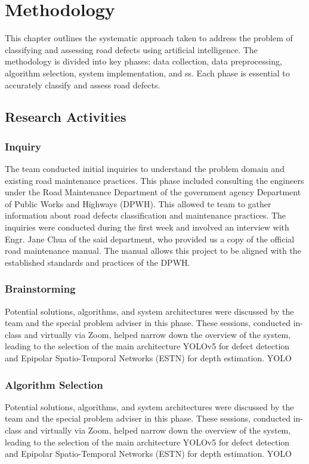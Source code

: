 
\setcounter{chapter}{2} 
\linespread{1.5}


	\chapter{Methodology}
	This chapter outlines the systematic approach taken to address the problem of classifying and assessing road defects using artificial intelligence. The methodology is divided into key phases: data collection, data preprocessing, algorithm selection, system implementation, and ss. Each phase is essential to accurately classify and assess road defects.
	\section{\textbf{ Research Activities} }
	
	\subsection{\textbf{Inquiry} }
	The team conducted initial inquiries to understand the problem domain and existing road maintenance practices. This phase included consulting the engineers under the Road Maintenance Department of the government agency Department of Public Works and Highways (DPWH). This allowed te team to gather information about road defects classification and maintenance practices. The inquiries were conducted during the first week and involved an interview with Engr. Jane Chua of the said department, who provided us a copy of the official road maintenance manual. The manual allows this project to be aligned with the established standards and practices of the DPWH.  
	
	\subsection{\textbf{Brainstorming} }
	Potential solutions, algorithms, and system architectures were discussed by the team and the special problem adviser in this phase. These sessions, conducted in-class and virtually via Zoom, helped narrow down the overview of the system, leading to the selection of the main architecture YOLOv5 for defect detection and Epipolar Spatio-Temporal Networks (ESTN) for depth estimation. YOLO
	
	\subsection{\textbf{Algorithm Selection } }
	Potential solutions, algorithms, and system architectures were discussed by the team and the special problem adviser in this phase. These sessions, conducted in-class and virtually via Zoom, helped narrow down the overview of the system, leading to the selection of the main architecture YOLOv5 for defect detection and Epipolar Spatio-Temporal Networks (ESTN) for depth estimation. YOLO
	
